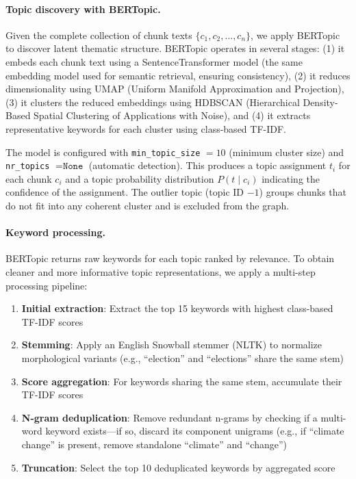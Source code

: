 \documentclass[10pt]{article}
\begin{document}
\paragraph{Topic discovery with BERTopic.} Given the complete collection of chunk texts $\{c_1, c_2, \ldots, c_n\}$, we apply BERTopic to discover latent thematic structure. BERTopic operates in several stages: (1) it embeds each chunk text using a SentenceTransformer model (the same embedding model used for semantic retrieval, ensuring consistency), (2) it reduces dimensionality using UMAP (Uniform Manifold Approximation and Projection), (3) it clusters the reduced embeddings using HDBSCAN (Hierarchical Density-Based Spatial Clustering of Applications with Noise), and (4) it extracts representative keywords for each cluster using class-based TF-IDF.

The model is configured with \texttt{min\_topic\_size} $= 10$ (minimum cluster size) and \texttt{nr\_topics} $= \texttt{None}$ (automatic detection). This produces a topic assignment $t_i$ for each chunk $c_i$ and a topic probability distribution $P(t \mid c_i)$ indicating the confidence of the assignment. The outlier topic (topic ID $-1$) groups chunks that do not fit into any coherent cluster and is excluded from the graph.

\paragraph{Keyword processing.} BERTopic returns raw keywords for each topic ranked by relevance. To obtain cleaner and more informative topic representations, we apply a multi-step processing pipeline:

\begin{enumerate}[itemsep=2pt]
    \item \textbf{Initial extraction}: Extract the top 15 keywords with highest class-based TF-IDF scores
    \item \textbf{Stemming}: Apply an English Snowball stemmer (NLTK) to normalize morphological variants (e.g., ``election'' and ``elections'' share the same stem)
    \item \textbf{Score aggregation}: For keywords sharing the same stem, accumulate their TF-IDF scores
    \item \textbf{N-gram deduplication}: Remove redundant n-grams by checking if a multi-word keyword exists---if so, discard its component unigrams (e.g., if ``climate change'' is present, remove standalone ``climate'' and ``change'')
    \item \textbf{Truncation}: Select the top 10 deduplicated keywords by aggregated score
\end{enumerate}
\end{document}
